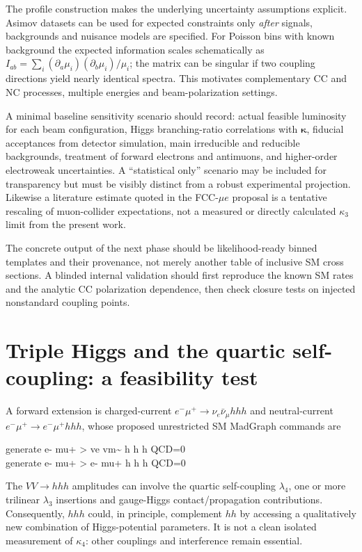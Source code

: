 \documentclass[12pt,a4paper]{article}
\newcommand{\newnote}{\clearpage}
\begin{document}
The profile construction makes the underlying uncertainty assumptions explicit. Asimov datasets can be used for expected constraints only \emph{after} signals, backgrounds and nuisance models are specified. For Poisson bins with known background the expected information scales schematically as $I_{ab}=\sum_i(\partial_a\mu_i)(\partial_b\mu_i)/\mu_i$; the matrix can be singular if two coupling directions yield nearly identical spectra. This motivates complementary CC and NC processes, multiple energies and beam-polarization settings.

A minimal baseline sensitivity scenario should record: actual feasible luminosity for each beam configuration, Higgs branching-ratio correlations with $\bm\kappa$, fiducial acceptances from detector simulation, main irreducible and reducible backgrounds, treatment of forward electrons and antimuons, and higher-order electroweak uncertainties. A ``statistical only'' scenario may be included for transparency but must be visibly distinct from a robust experimental projection. Likewise a literature estimate quoted in the FCC-$\mu e$ proposal is a tentative rescaling of muon-collider expectations, not a measured or directly calculated $\kappa_3$ limit from the present work.

The concrete output of the next phase should be likelihood-ready binned templates and their provenance, not merely another table of inclusive SM cross sections. A blinded internal validation should first reproduce the known SM rates and the analytic CC polarization dependence, then check closure tests on injected nonstandard coupling points.




\newnote

\section{Triple Higgs and the quartic self-coupling: a feasibility test}

A forward extension is charged-current $e^-\mu^+\to\nu_e\bar\nu_\mu hhh$ and neutral-current $e^-\mu^+\to e^-\mu^+hhh$, whose proposed unrestricted SM MadGraph commands are
\begin{center}\ttfamily\small
 generate e- mu+ > ve vm\textasciitilde{} h h h QCD=0\\
 generate e- mu+ > e- mu+ h h h QCD=0
\end{center}

The $VV\to hhh$ amplitudes can involve the quartic self-coupling $\lambda_4$, one or more trilinear $\lambda_3$ insertions and gauge-Higgs contact/propagation contributions. Consequently, $hhh$ could, in principle, complement $hh$ by accessing a qualitatively new combination of Higgs-potential parameters. It is not a clean isolated measurement of $\kappa_4$: other couplings and interference remain essential.
\end{document}
